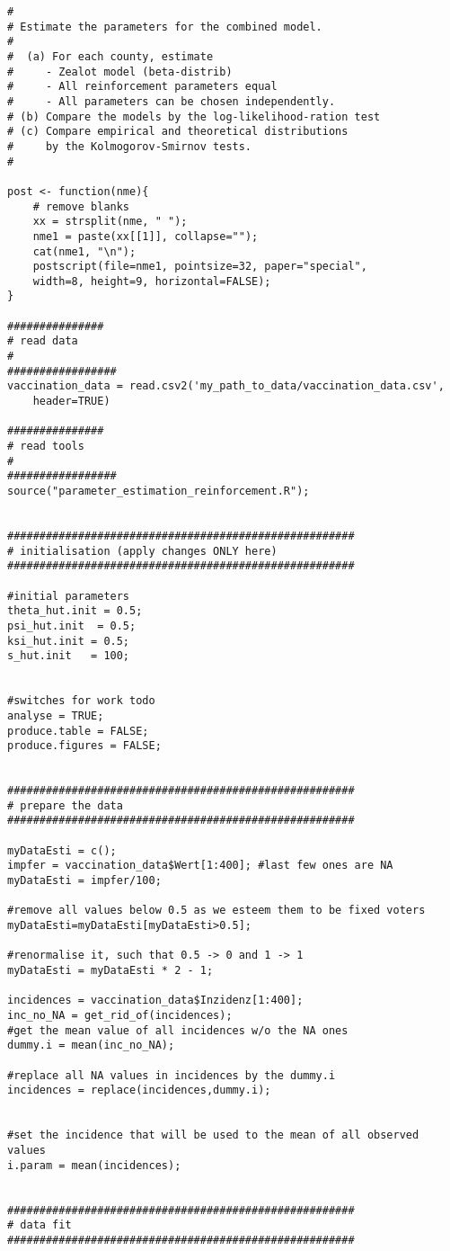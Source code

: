 \begin{lstlisting}
#
# Estimate the parameters for the combined model.
#
#  (a) For each county, estimate
#     - Zealot model (beta-distrib)
#     - All reinforcement parameters equal
#     - All parameters can be chosen independently.
# (b) Compare the models by the log-likelihood-ration test
# (c) Compare empirical and theoretical distributions 
#     by the Kolmogorov-Smirnov tests.
#

post <- function(nme){
	# remove blanks
	xx = strsplit(nme, " ");
	nme1 = paste(xx[[1]], collapse="");
	cat(nme1, "\n");
	postscript(file=nme1, pointsize=32, paper="special",
	width=8, height=9, horizontal=FALSE);
}

###############
# read data
#
#################
vaccination_data = read.csv2('my_path_to_data/vaccination_data.csv', 
	header=TRUE)

###############
# read tools
#
#################
source("parameter_estimation_reinforcement.R");


######################################################
# initialisation (apply changes ONLY here)
######################################################

#initial parameters
theta_hut.init = 0.5;
psi_hut.init  = 0.5;
ksi_hut.init = 0.5;
s_hut.init   = 100; 


#switches for work todo
analyse = TRUE;
produce.table = FALSE;
produce.figures = FALSE;


######################################################
# prepare the data
######################################################

myDataEsti = c();
impfer = vaccination_data$Wert[1:400]; #last few ones are NA
myDataEsti = impfer/100; 

#remove all values below 0.5 as we esteem them to be fixed voters
myDataEsti=myDataEsti[myDataEsti>0.5];

#renormalise it, such that 0.5 -> 0 and 1 -> 1
myDataEsti = myDataEsti * 2 - 1;

incidences = vaccination_data$Inzidenz[1:400];
inc_no_NA = get_rid_of(incidences);
#get the mean value of all incidences w/o the NA ones
dummy.i = mean(inc_no_NA);

#replace all NA values in incidences by the dummy.i
incidences = replace(incidences,dummy.i);


#set the incidence that will be used to the mean of all observed values
i.param = mean(incidences);


######################################################
# data fit
######################################################



\end{lstlisting}
